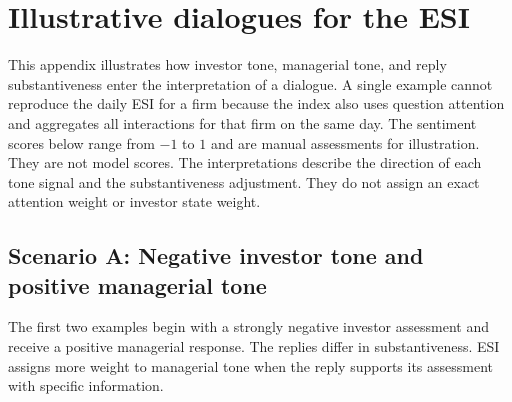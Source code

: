 \section{Illustrative dialogues for the ESI} \label{app:cases}

This appendix illustrates how investor tone, managerial tone, and reply substantiveness enter the interpretation of a dialogue. A single example cannot reproduce the daily ESI for a firm because the index also uses question attention and aggregates all interactions for that firm on the same day. The sentiment scores below range from $-1$ to $1$ and are manual assessments for illustration. They are not model scores. The interpretations describe the direction of each tone signal and the substantiveness adjustment. They do not assign an exact attention weight or investor state weight.

\subsection{Scenario A: Negative investor tone and positive managerial tone}

The first two examples begin with a strongly negative investor assessment and receive a positive managerial response. The replies differ in substantiveness. ESI assigns more weight to managerial tone when the reply supports its assessment with specific information.

